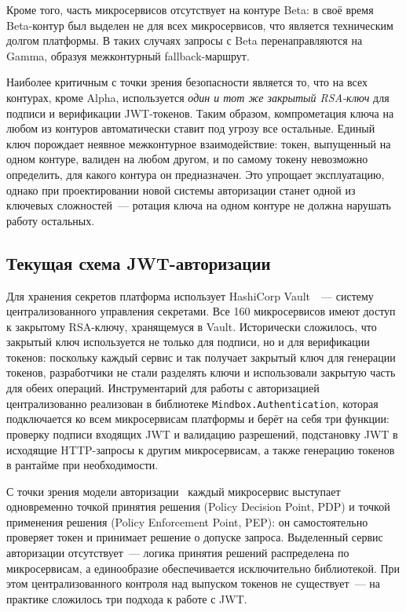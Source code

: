 Кроме того, часть микросервисов отсутствует на контуре Beta:
в своё время Beta-контур был выделен не для всех микросервисов,
что является техническим долгом платформы.
В таких случаях запросы с Beta перенаправляются на Gamma, образуя межконтурный fallback-маршрут.

Наиболее критичным с точки зрения безопасности является то,
что на всех контурах, кроме Alpha, используется \emph{один и тот же закрытый RSA-ключ}
для подписи и верификации JWT-токенов.
Таким образом, компрометация ключа на любом из контуров автоматически ставит под угрозу все остальные.
Единый ключ порождает неявное межконтурное взаимодействие:
токен, выпущенный на одном контуре, валиден на любом другом,
и по самому токену невозможно определить, для какого контура он предназначен.
Это упрощает эксплуатацию,
однако при проектировании новой системы авторизации станет одной из ключевых сложностей~---
ротация ключа на одном контуре не должна нарушать работу остальных.

\subsection{Текущая схема JWT-авторизации}\label{subsec:jwt-scheme}

Для хранения секретов платформа использует HashiCorp Vault~\cite{HashiCorpVault}~---
систему централизованного управления секретами.
Все 160 микросервисов имеют доступ к закрытому RSA-ключу, хранящемуся в Vault.
Исторически сложилось, что закрытый ключ используется
не только для подписи, но и для верификации токенов:
поскольку каждый сервис и так получает закрытый ключ для генерации токенов,
разработчики не стали разделять ключи
и использовали закрытую часть для обеих операций.
Инструментарий для работы с авторизацией централизованно реализован
в библиотеке \texttt{Mindbox.Authentication},
которая подключается ко всем микросервисам платформы
и берёт на себя три функции:
проверку подписи входящих JWT и валидацию разрешений,
подстановку JWT в исходящие HTTP-запросы к другим микросервисам,
а также генерацию токенов в рантайме при необходимости.

С точки зрения модели авторизации~\cite{AWSPDP}
каждый микросервис выступает одновременно
точкой принятия решения (Policy Decision Point, PDP)
и точкой применения решения (Policy Enforcement Point, PEP):
он самостоятельно проверяет токен и принимает решение о допуске запроса.
Выделенный сервис авторизации отсутствует~---
логика принятия решений распределена по микросервисам,
а единообразие обеспечивается исключительно библиотекой.
При этом централизованного контроля над выпуском токенов не существует~---
на практике сложилось три подхода к работе с JWT\@.

